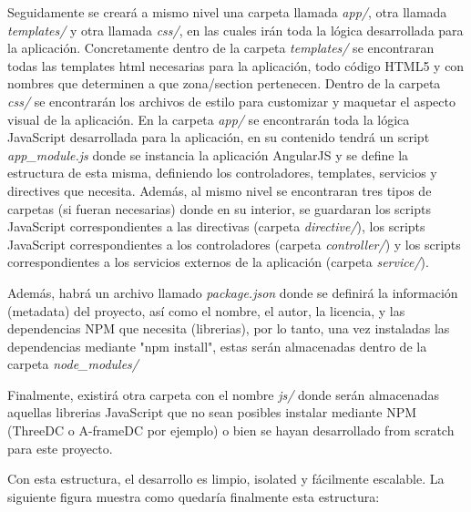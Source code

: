 \documentclass[a4paper, 12pt]{book}
\begin{document}
Seguidamente se creará a mismo nivel una carpeta llamada \textit{app/}, otra llamada \textit{templates/} y otra llamada \textit{css/}, en las cuales irán toda la lógica desarrollada para la aplicación. Concretamente dentro de la carpeta \textit{templates/} se encontraran todas las templates html necesarias para la aplicación, todo código HTML5 y con nombres que determinen a que zona/section pertenecen. Dentro de la carpeta \textit{css/} se encontrarán los archivos de estilo para customizar y maquetar el aspecto visual de la aplicación. En la carpeta \textit{app/} se encontrarán toda la lógica JavaScript desarrollada para la aplicación, en su contenido tendrá un script \textit{app\_module.js} donde se instancia la aplicación AngularJS y se define la estructura de esta misma, definiendo los controladores, templates, servicios y directives que necesita. Además, al mismo nivel se encontraran tres tipos de carpetas (si fueran necesarias) donde en su interior, se guardaran los scripts JavaScript correspondientes a las directivas (carpeta \textit{directive/}), los scripts JavaScript correspondientes a los controladores (carpeta \textit{controller/}) y los scripts correspondientes a los servicios externos de la aplicación (carpeta \textit{service/}).

Además, habrá un archivo llamado \textit{package.json} donde se definirá la información (metadata) del proyecto, así como el nombre, el autor, la licencia, y las dependencias NPM que necesita (librerias), por lo tanto, una vez instaladas las dependencias mediante "npm install", estas serán almacenadas dentro de la carpeta \textit{node\_modules/}

Finalmente, existirá otra carpeta con el nombre \textit{js/} donde serán almacenadas aquellas librerias JavaScript que no sean posibles instalar mediante NPM (ThreeDC o A-frameDC por ejemplo) o bien se hayan desarrollado from scratch para este proyecto.

Con esta estructura, el desarrollo es limpio, isolated y fácilmente escalable. La siguiente figura muestra como quedaría finalmente esta estructura:
\end{document}
